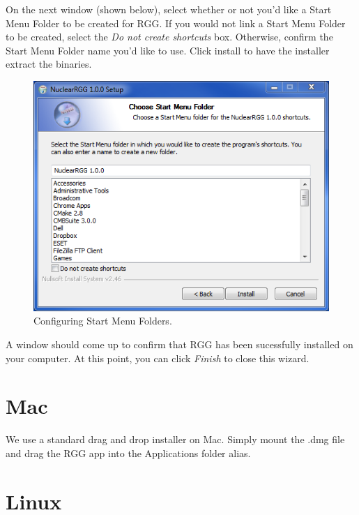 On the next window (shown below), select whether or not you'd like a Start Menu Folder to be created for RGG.  If you would not link a Start Menu Folder to be created, select the \emph{Do not create shortcuts} box.  Otherwise, confirm the Start Menu Folder name you'd like to use.  Click install to have the installer extract the binaries.

\begin{figure}[H]
	\begin{center}
		\includegraphics[width=0.5\linewidth]{Images/windows-install-3.png}
		\caption{Configuring Start Menu Folders.}
		\label{fig:WindowsInstall3}
	\end{center}
\end{figure}

A window should come up to confirm that RGG has been sucessfully installed on your computer.  At this point, you can click \emph{Finish} to close this wizard.

\section{Mac}
We use a standard drag and drop installer on Mac.  Simply mount the .dmg file and drag the RGG app into the Applications folder alias.

\section{Linux}
